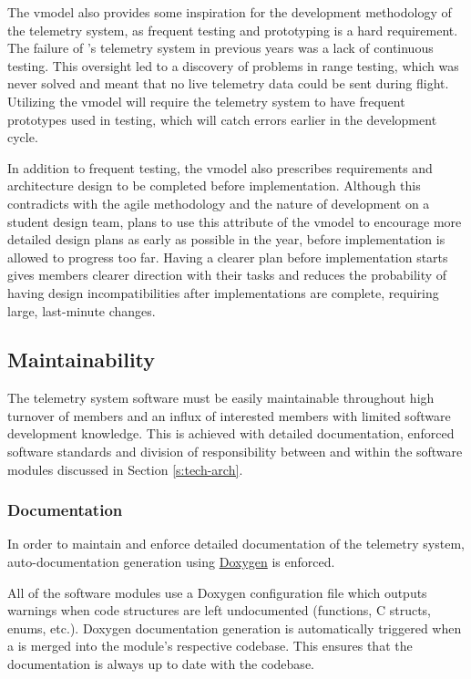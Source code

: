 The \gls{vmodel} also provides some inspiration for the development methodology of the telemetry system, as frequent
testing and prototyping is a hard requirement. The failure of 's telemetry system in previous
years was a lack of continuous testing. This oversight led to a discovery of problems in range testing, which was never
solved and meant that no live telemetry data could be sent during flight. Utilizing the \gls{vmodel} will require the
telemetry system to have frequent prototypes used in testing, which will catch errors earlier in the development cycle.

In addition to frequent testing, the \gls{vmodel} also prescribes requirements and architecture design to be completed
before implementation. Although this contradicts with the \gls{agile} methodology and the nature of development on a
student design team,  plans to use this attribute of the \gls{vmodel} to encourage more detailed
design plans as early as possible in the year, before implementation is allowed to progress too far. Having a clearer
plan before implementation starts gives members clearer direction with their tasks and reduces the probability of
having design incompatibilities after implementations are complete, requiring large, last-minute changes.

\subsection{Maintainability}

The  telemetry system software must be easily maintainable throughout high turnover of members
and an influx of interested members with limited software development knowledge. This is achieved with detailed
documentation, enforced software standards and division of responsibility between and within the software modules
discussed in Section \ref{s:tech-arch}.

\subsubsection{Documentation}

In order to maintain and enforce detailed documentation of the telemetry system, auto-documentation generation using
\href{https://www.doxygen.nl/index.html}{Doxygen} is enforced.

All of the software modules use a Doxygen configuration file which outputs warnings when code structures are left
undocumented (functions, C structs, enums, etc.). Doxygen documentation generation is automatically triggered when a
 is merged into the module's respective codebase. This ensures that the documentation is always up to
date with the codebase.

